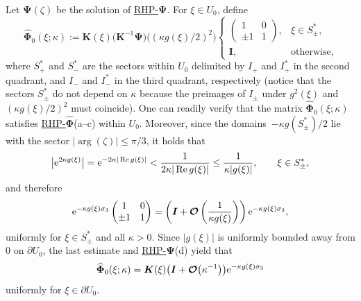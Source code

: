 \documentclass[pdftex]{sigma}
\numberwithin{equation}{section}
\newcommand{\re}{\operatorname{Re} }
\renewcommand{\arg}{\operatorname{arg}}
\newcommand{\rhpsi} {\textnormal{RHP}-${\boldsymbol \Psi}$}
\newcommand{\rhhphi} {\textnormal{RHP}-${\widehat{\boldsymbol \Phi}}$}
\begin{document}
Let $ \boldsymbol\Psi(\zeta) $ be the solution of \hyperref[rhpsi]{\rhpsi}. For $ \xi \in U_0 $, define
\[
 \widehat{\boldsymbol\Phi}_0(\xi;\kappa) := \boldsymbol K(\xi) \bigl(\boldsymbol K^{-1} \boldsymbol\Psi\bigr)\bigl( (\kappa g(\xi)/2 )^2 \bigr)
\begin{cases}
\begin{pmatrix} 1 & 0 \\ \pm 1 & 1 \end{pmatrix}, & \xi\in S_\pm^*, \\
\boldsymbol I, & \text{otherwise},
\end{cases}
\]
where $ S_+^* $ and $ S_-^* $ are the sectors within $ U_0 $ delimited by $ I_+ $ and $ I_+^* $ in the second quadrant, and $ I_- $ and $ I_-^* $ in the third quadrant, respectively (notice that the sectors $ S_\pm^* $ do not depend on $ \kappa $ because the preimages of $ I_\pm $ under $ g^2(\xi) $ and $ (\kappa g(\xi)/2)^2 $ must coincide). One can readily verify that the matrix $ \widehat{\boldsymbol\Phi}_0(\xi;\kappa) $ satisfies \hyperref[rhhphi]{\rhhphi}(a--c) within $ U_0 $. Moreover, since the domains~$ - \kappa g(S_\pm^*)/2 $ lie with the sector $ |\arg(\zeta)|\leq\pi/3 $, it holds that
\[
\big| {\rm e}^{2\kappa g(\xi)} \big| = {\rm e}^{-2\kappa|\re g(\xi)|} < \frac1{2\kappa |\re g(\xi)|} \leq \frac1{\kappa|g(\xi)|}, \qquad \xi\in S_\pm^*,
\]
and therefore
\[
{\rm e}^{-\kappa g(\xi)\sigma_3} \begin{pmatrix} 1 & 0 \\ \pm1 & 1 \end{pmatrix} = \left( \boldsymbol I + \boldsymbol{\mathcal O}\left(\frac1{\kappa g(\xi)}\right) \right) {\rm e}^{-\kappa g(\xi)\sigma_3},
\]
uniformly for $ \xi\in S_\pm^* $ and all $ \kappa>0 $. Since $ |g(\xi)| $ is uniformly bounded away from $ 0 $ on $ \partial U_0 $, the last estimate and \hyperref[rhpsi]{\rhpsi}(d) yield that
\[
\widehat{\boldsymbol\Phi}_0(\xi;\kappa) = \boldsymbol K(\xi) \bigl(\boldsymbol I + \boldsymbol{\mathcal O}\bigl(\kappa^{-1}\bigr) \bigr) {\rm e}^{-\kappa g(\xi)\sigma_3}
\]
uniformly for $ \xi\in\partial U_0 $.
\end{document}
